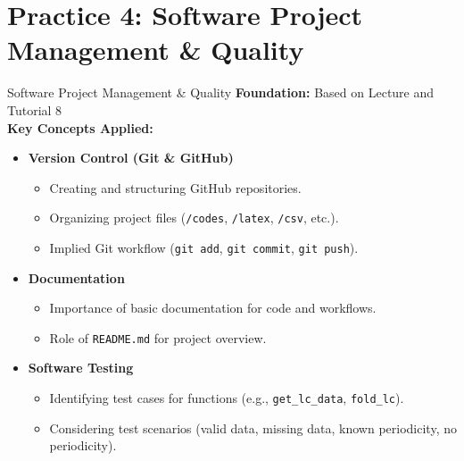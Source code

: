 \documentclass[12pt, aspectratio=169]{beamer}
\renewcommand{\small}{\fontsize{11}{13}\selectfont}
\newcommand{\rcode}[1]{{\small\texttt{#1}}}
\begin{document}
  \section{Practice 4: Software Project Management \& Quality}
  \begin{frame}[t]{Software Project Management \& Quality}
    \textbf{Foundation:} Based on Lecture and Tutorial 8 \\\vspace{2.5mm}
    \textbf{Key Concepts Applied:} \\\vspace{2.5mm}
    \begin{itemize}
      \item \textbf{Version Control (Git \& GitHub)} \vspace{1mm}
      \begin{itemize}
        \item Creating and structuring GitHub repositories.
        \item Organizing project files (\rcode{/codes}, \rcode{/latex},
        \rcode{/csv}, etc.).
        \item Implied Git workflow (\rcode{git add}, \rcode{git commit},
        \rcode{git push}).
      \end{itemize} \vspace{1mm}
      \item \textbf{Documentation} \vspace{1mm}
      \begin{itemize}
        \item Importance of basic documentation for code and workflows.
        \item Role of \rcode{README.md} for project overview.
      \end{itemize} \vspace{1mm}
      \item \textbf{Software Testing} \vspace{1mm}
      \begin{itemize}
        \item Identifying test cases for functions (e.g., \rcode{get\_lc\_data},
        \rcode{fold\_lc}).
        \item Considering test scenarios (valid data, missing data, known
        periodicity, no periodicity).
      \end{itemize}
    \end{itemize}
  \end{frame}
\end{document}
